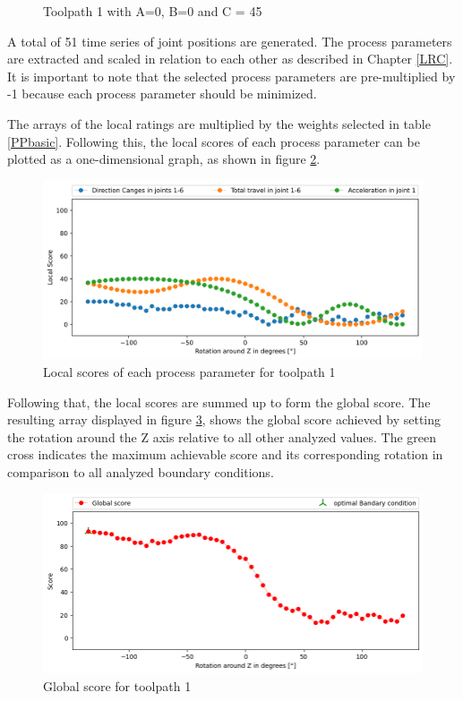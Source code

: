 \begin{figure}[H]
\begin{minipage}{0.5\textwidth}
		\caption{Toolpath 1 with A=0, B=0 and C = 45}
		\label{TP1+25}
	\end{minipage}\par
\end{figure}

A total of 51 time series of joint positions are generated. The process parameters are extracted and scaled in relation to each other as described in Chapter \ref{LRC}. It is important to note that the selected process parameters are pre-multiplied by -1 because each process parameter should be minimized.

The arrays of the local ratings are multiplied by the weights selected in table \ref{PPbasic}.
Following this, the local scores of each process parameter can be plotted as a one-dimensional graph, as shown in figure \ref{LS1}. %

\begin{figure}[H]
	\centerline{\includegraphics[width=1\textwidth]{figures/LocalScores_1.png}}
	\caption{Local scores of each process parameter for toolpath 1}
	\label{LS1}
\end{figure}


Following that, the local scores are summed up to form the global score. The resulting array displayed in figure \ref{GS1}, shows the global score achieved by setting the rotation around the Z axis relative to all other analyzed values. The green cross indicates the maximum achievable score and its corresponding rotation in comparison to all analyzed boundary conditions.


\begin{figure}[H]
	\centerline{\includegraphics[width=1\textwidth]{figures/best_c_1.png}}
	\caption{Global score for toolpath 1}
	\label{GS1}
\end{figure}

